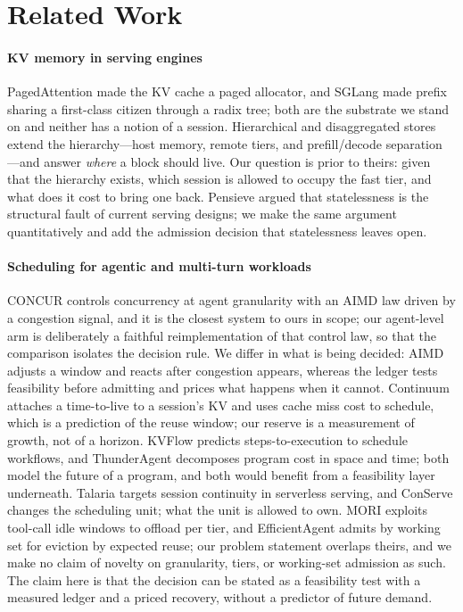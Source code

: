 \section{Related Work}
\label{sec:related}

\paragraph{KV memory in serving engines} PagedAttention \cite{kwon2023pagedattention}
made the KV cache a paged allocator, and SGLang \cite{zheng2024sglang} made prefix sharing a
first-class citizen through a radix tree; both are the substrate we stand on and neither has
a notion of a session. Hierarchical and disaggregated stores extend the hierarchy---host
memory, remote tiers, and prefill/decode separation \cite{mooncake,distserve}---and answer
\emph{where} a block should live. Our question is prior to theirs: given that the hierarchy
exists, which session is allowed to occupy the fast tier, and what does it cost to bring one
back. Pensieve \cite{yu2025pensieve} argued that statelessness is the structural fault of
current serving designs; we make the same argument quantitatively and add the admission
decision that statelessness leaves open.

\paragraph{Scheduling for agentic and multi-turn workloads} CONCUR \cite{concur} controls
concurrency at agent granularity with an AIMD law driven by a congestion signal, and it is
the closest system to ours in scope; our agent-level arm is deliberately a faithful
reimplementation of that control law, so that the comparison isolates the decision rule. We
differ in what is being decided: AIMD adjusts a window and reacts after congestion appears,
whereas the ledger tests feasibility before admitting and prices what happens when it
cannot. Continuum \cite{continuum} attaches a time-to-live to a session's KV and uses cache
miss cost to schedule, which is a prediction of the reuse window; our reserve is a
measurement of growth, not of a horizon. KVFlow
predicts
steps-to-execution to schedule workflows, and ThunderAgent \cite{thunderagent} decomposes
program cost in space and time; both model the future of a program, and both would benefit
from a feasibility layer underneath. Talaria \cite{talaria} targets session continuity in
serverless serving, and ConServe changes the scheduling unit;
what the unit is allowed to own. MORI \cite{mori} exploits tool-call idle windows to offload
per tier, and EfficientAgent admits by working set
for eviction by expected reuse; our problem statement overlaps theirs, and we make no claim
of novelty on granularity, tiers, or working-set admission as such. The claim here is that
the decision can be stated as a feasibility test with a measured ledger and a priced
recovery, without a predictor of future demand.

